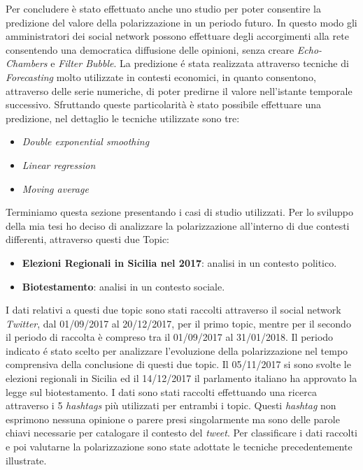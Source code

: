 Per concludere è stato effettuato anche uno studio per poter consentire la predizione del valore della polarizzazione in un periodo futuro. In questo modo gli amministratori dei social network possono effettuare degli accorgimenti alla rete consentendo una democratica diffusione delle opinioni, senza creare \textit{Echo-Chambers} e \textit{Filter Bubble}.  
La predizione \'e stata realizzata attraverso tecniche di \textit{Forecasting} molto utilizzate in contesti economici, in quanto consentono, attraverso delle serie numeriche, di poter predirne il valore nell'istante temporale successivo. Sfruttando queste particolarità è stato possibile effettuare una predizione, nel dettaglio le tecniche utilizzate sono tre:
\begin{itemize}
\item \textit{Double exponential smoothing}
\item \textit{Linear regression}
\item \textit{Moving average}
\end{itemize}


Terminiamo questa sezione presentando i casi di studio utilizzati. Per lo sviluppo della mia tesi ho deciso di analizzare  la polarizzazione all'interno di due contesti differenti, attraverso questi due Topic:
\begin{itemize}
\item \textbf{Elezioni Regionali in Sicilia nel 2017}: analisi in un contesto politico.
\item \textbf{Biotestamento}: analisi in un contesto sociale.
\end{itemize}
I dati relativi a questi due topic sono stati raccolti attraverso il social network \textit{Twitter}, dal 01/09/2017 al 20/12/2017, per il primo topic, mentre per il secondo il periodo di raccolta è compreso tra il 01/09/2017 al 31/01/2018. Il periodo indicato \'e stato scelto per analizzare l'evoluzione della polarizzazione nel tempo comprensiva della conclusione di questi due topic.
Il 05/11/2017 si sono svolte le elezioni regionali in Sicilia ed il 14/12/2017 il parlamento italiano ha approvato la legge sul biotestamento.
I dati sono stati raccolti effettuando una ricerca attraverso i 5 \textit{hashtags} più utilizzati per entrambi i topic. Questi \textit{hashtag} non esprimono nessuna opinione o parere presi singolarmente ma sono delle parole chiavi necessarie per catalogare il contesto del \textit{tweet}. Per classificare i dati raccolti e poi valutarne la polarizzazione sono state adottate le tecniche precedentemente illustrate.

